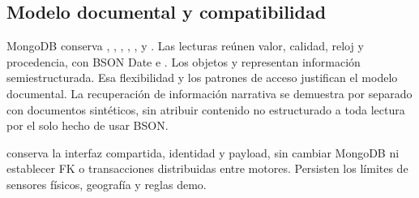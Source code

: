\subsection{Modelo documental y compatibilidad}
MongoDB conserva , , ,
, ,  y .
Las lecturas reúnen valor, calidad, reloj y procedencia, con BSON Date e
. Los objetos  y
 representan información semiestructurada. Esa flexibilidad
y los patrones de acceso justifican el modelo documental. La recuperación de
información narrativa se demuestra por separado con documentos sintéticos, sin
atribuir contenido no estructurado a toda lectura por el solo hecho de usar BSON.

 conserva la interfaz compartida, identidad y
payload, sin cambiar MongoDB ni establecer FK o transacciones distribuidas entre
motores. Persisten los límites de sensores físicos, geografía y reglas demo.


